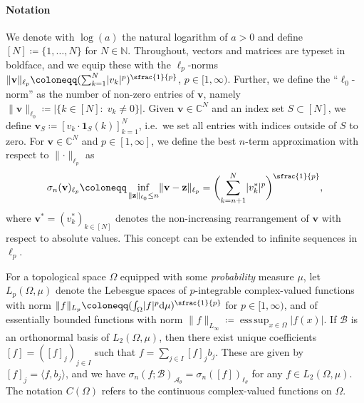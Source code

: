 \documentclass[11pt,reqno, a4paper]{article}
\numberwithin{equation}{section}
\newcommand{\N}{\mathbb{N}}
\begin{document}
\paragraph{Notation} %
We denote with $\log(a)$ the natural logarithm of $a>0$ and define $[N]\coloneqq\{1,\ldots,N\}$ for $N \in \N$.
Throughout, vectors and matrices are typeset in boldface, and we equip these with the $\ell_p$-norms $\lVert\mathbf{v}\rVert_{\ell_p}\coloneqq (\sum_{k=1}^{N}\lvert v_k\rvert^p)^{\sfrac{1}{p}}$, $p\in[1,\infty)$.
Further, we define the \enquote{$\ell_0$-norm} as the number of non-zero entries of $\mathbf{v}$, namely $\lVert\mathbf{v}\rVert_{\ell_0}\coloneqq\lvert\{k\in[N]\colon \; v_k\neq 0\}\rvert$.
Given $\mathbf{v}\in\mathbb{C}^N$ and an index set $S\subset[N]$, we define $\mathbf{v}_S\coloneqq[v_k\cdot\mathbf{1}_S(k)]_{k=1}^N$, i.e.\ we set all entries with indices outside of $S$ to zero.
For $\mathbf{v}\in\mathbb{C}^N$ and $p\in[1,\infty]$, we define the best $n$-term approximation with respect to $\lVert\cdot\rVert_{\ell_p}$ as
\begin{equation}
\sigma_n(\mathbf{v})_{\ell_p}\coloneqq \inf_{\lVert\mathbf{z}\rVert_{\ell_0}\leq n}\lVert\mathbf{v}-\mathbf{z}\rVert_{\ell_p} = \biggl(\sum\limits_{k=n+1}^N \lvert v_k^{\ast}\rvert^p\biggr)^{\sfrac{1}{p}},
\end{equation}
where $\mathbf{v}^*=(v_k^{\ast})_{k\in[N]}$ denotes the non-increasing rearrangement of $\mathbf{v}$ with respect to absolute values.
This concept can be extended to infinite sequences in $\ell_p$.

For a topological space $\Omega$ equipped with some \emph{probability} measure $\mu$, let $L_p(\Omega, \mu)$ denote the Lebesgue spaces of $p$-integrable complex-valued functions with norm $\lVert f\rVert_{L_p}\coloneqq(\int_\Omega\lvert f\rvert^p\mathrm{d}\mu)^{\sfrac{1}{p}}$ for $p\in[1,\infty)$, and of essentially bounded functions with norm $\lVert f\rVert_{L_\infty}\coloneqq\operatorname{ess\, sup}_{x\in\Omega}\lvert f(x)\rvert$.
If $\mathcal{B}$ is an orthonormal basis of $L_2(\Omega,\mu)$, then there exist unique coefficients $[f] = ([f]_j)_{j\in I}$ such that $f=\sum_{j\in I}[f]_jb_j$.
These are given by $[f]_j = \langle f, b_j \rangle$, and we have $\sigma_n(f;\mathcal{B})_{\mathcal{A}_\theta}= \sigma_n([f])_{\ell_\theta}$ for any $f\in L_2(\Omega,\mu)$. 
The notation $C(\Omega)$ refers to the continuous complex-valued functions on $\Omega$.
\end{document}
